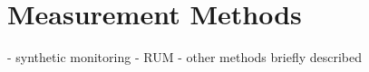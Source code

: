 	
	














\section{Measurement Methods}


- synthetic monitoring
- RUM
- other methods briefly described


